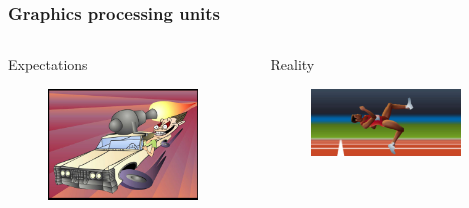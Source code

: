 \documentclass[10pt]{beamer}
\begin{document}
\begin{frame}
\frametitle{Graphics processing units}
\begin{columns}[c]
     \begin{column}[T]{5cm}
        Expectations
        \begin{figure}
        \includegraphics[width=150px]{img/expectations.jpg}
        \end{figure}
    \end{column}

    \begin{column}[T]{5cm}
        Reality
        \begin{figure}
        \includegraphics[width=150px]{img/reality.png}
        \end{figure}
    \end{column}
\end{columns}
\end{frame}
\fi
\end{document}
